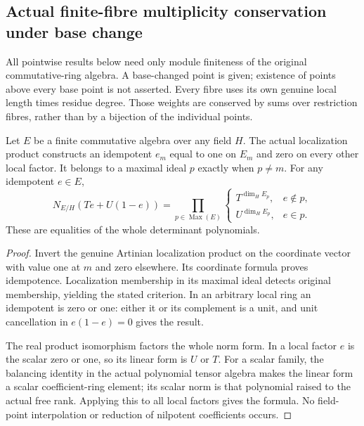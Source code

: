 \subsection{Actual finite-fibre multiplicity conservation under base change}
\label{subsec:finite-fibre-multiplicity-base-change}

All pointwise results below need only module finiteness of the original
commutative-ring algebra. A base-changed point is given; existence of points
above every base point is not asserted. Every fibre uses its own genuine
local length times residue degree. Those weights are conserved by sums over
restriction fibres, rather than by a bijection of the individual points.

\begin{lemma}
\label{algebra:finite-factor-idempotent-norm}
\leanok
{}
Let $E$ be a finite commutative algebra over any field $H$. The actual
localization product constructs an idempotent $e_m$ equal to one on $E_m$
and zero on every other local factor. It belongs to a maximal ideal $p$
exactly when $p\ne m$. For any idempotent $e\in E$,
\[
 N_{E/H}(Te+U(1-e))=
 \prod_{p\in\operatorname{Max}(E)}
 \begin{cases}T^{\dim_HE_p},&e\notin p,\\
 U^{\dim_HE_p},&e\in p.
 \end{cases}
\]
These are equalities of the whole determinant polynomials.
\end{lemma}
\begin{proof}
Invert the genuine Artinian localization product on the coordinate vector
with value one at $m$ and zero elsewhere. Its coordinate formula proves
idempotence. Localization membership in its maximal ideal detects original
membership, yielding the stated criterion. In an arbitrary local ring an
idempotent is zero or one: either it or its complement is a unit, and
unit cancellation in $e(1-e)=0$ gives the result.

The real product isomorphism factors the whole norm form. In a local factor
$e$ is the scalar zero or one, so its linear form is $U$ or $T$.
For a scalar family, the balancing identity in the actual polynomial tensor
algebra makes the linear form a scalar coefficient-ring element; its scalar
norm is that polynomial raised to the actual free rank. Applying this to all
local factors gives the formula. No field-point interpolation or reduction
of nilpotent coefficients occurs.
\end{proof}

